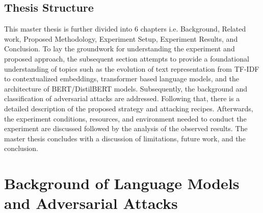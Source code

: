 \documentclass[%
	BCOR=8mm, %
	DIV=12,
	toc=bibliography, %
	toc=listof, %
	oneside, %
	egregdoesnotlikesansseriftitles, %
	]{scrbook}
\begin{document}
\section{Thesis Structure}
This master thesis is further divided into 6 chapters i.e. Background, Related work, Proposed Methodology, Experiment Setup, Experiment Results, and Conclusion. To lay the groundwork for understanding the experiment and proposed approach, the subsequent section attempts to provide a foundational understanding of topics such as the evolution of text representation from TF-IDF to contextualized embeddings, transformer based language models, and the architecture of BERT/DistilBERT models. Subsequently, the background and classification of adversarial attacks are addressed. Following that, there is a detailed description of the proposed strategy and attacking recipes. Afterwards, the experiment conditions, resources, and environment needed to conduct the experiment are discussed followed by the analysis of the observed results. The master thesis concludes with a discussion of limitations, future work, and the conclusion.
\chapter{Background of Language Models and Adversarial Attacks}
\label{section:background}
\end{document}
